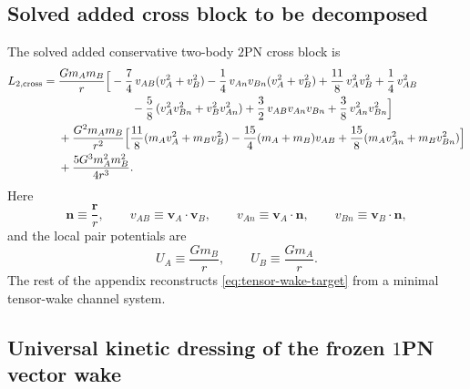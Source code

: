 \documentclass[11pt]{article}
\newcommand{\TwoPN}{\mathrm{2PN}}
\begin{document}
\subsection{Solved added cross block to be decomposed}
\label{app:tensor-wake-target}

The solved added conservative two-body \(\TwoPN\) cross block is
\begin{align}
L_{2,\mathrm{cross}}
={}&
\frac{Gm_A m_B}{r}
\Big[
-\frac74\,v_{AB}(v_A^2+v_B^2)
-\frac14\,v_{An}v_{Bn}(v_A^2+v_B^2)
+\frac{11}{8}\,v_A^2v_B^2
+\frac14\,v_{AB}^2
\notag\\
&\hspace{6.4em}
-\frac58\,(v_A^2v_{Bn}^2+v_B^2v_{An}^2)
+\frac32\,v_{AB}v_{An}v_{Bn}
+\frac38\,v_{An}^2v_{Bn}^2
\Big]
\notag\\
&+
\frac{G^2m_A m_B}{r^2}
\Big[
\frac{11}{8}(m_A v_A^2+m_B v_B^2)
-\frac{15}{4}(m_A+m_B)v_{AB}
+\frac{15}{8}(m_A v_{An}^2+m_B v_{Bn}^2)
\Big]
\notag\\
&+
\frac{5G^3m_A^2m_B^2}{4r^3}.
\label{eq:tensor-wake-target}
\end{align}
Here
\begin{equation}
\mathbf n\equiv \frac{\mathbf r}{r},
\qquad
v_{AB}\equiv \mathbf v_A\!\cdot\!\mathbf v_B,
\qquad
v_{An}\equiv \mathbf v_A\!\cdot\!\mathbf n,
\qquad
v_{Bn}\equiv \mathbf v_B\!\cdot\!\mathbf n,
\label{eq:tensor-wake-basic-defs}
\end{equation}
and the local pair potentials are
\begin{equation}
U_A\equiv \frac{Gm_B}{r},
\qquad
U_B\equiv \frac{Gm_A}{r}.
\label{eq:tensor-wake-UAUB}
\end{equation}
The rest of the appendix reconstructs
\cref{eq:tensor-wake-target} from a minimal tensor-wake channel system.

\subsection{Universal kinetic dressing of the frozen \texorpdfstring{$1$}{1}PN vector wake}
\label{app:tensor-wake-vector}
\end{document}
